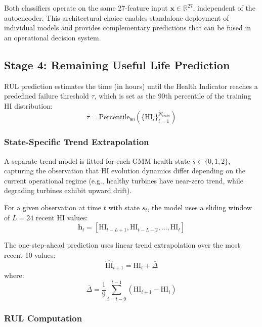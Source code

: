 \documentclass[preprint,12pt]{elsarticle}
\begin{document}
Both classifiers operate on the same 27-feature input $\mathbf{x} \in \mathbb{R}^{27}$, independent of the autoencoder. This architectural choice enables standalone deployment of individual models and provides complementary predictions that can be fused in an operational decision system.

\subsection{Stage 4: Remaining Useful Life Prediction}
\label{sec:rul}

RUL prediction estimates the time (in hours) until the Health Indicator reaches a predefined failure threshold $\tau$, which is set as the 90th percentile of the training HI distribution:
\begin{equation}
    \tau = \mathrm{Percentile}_{90}\!\left(\{\mathrm{HI}_i\}_{i=1}^{N_{\mathrm{train}}}\right)
\end{equation}

\subsubsection{State-Specific Trend Extrapolation}

A separate trend model is fitted for each GMM health state $s \in \{0, 1, 2\}$, capturing the observation that HI evolution dynamics differ depending on the current operational regime (e.g., healthy turbines have near-zero trend, while degrading turbines exhibit upward drift).

For a given observation at time $t$ with state $s_t$, the model uses a sliding window of $L = 24$ recent HI values:
\begin{equation}
    \mathbf{h}_t = [\mathrm{HI}_{t-L+1}, \mathrm{HI}_{t-L+2}, \ldots, \mathrm{HI}_t]
\end{equation}

The one-step-ahead prediction uses linear trend extrapolation over the most recent 10 values:
\begin{equation}
    \widehat{\mathrm{HI}}_{t+1} = \mathrm{HI}_t + \bar{\Delta}
\end{equation}
where:
\begin{equation}
    \bar{\Delta} = \frac{1}{9} \sum_{i=t-9}^{t-1} (\mathrm{HI}_{i+1} - \mathrm{HI}_i)
\end{equation}

\subsubsection{RUL Computation}
\end{document}
